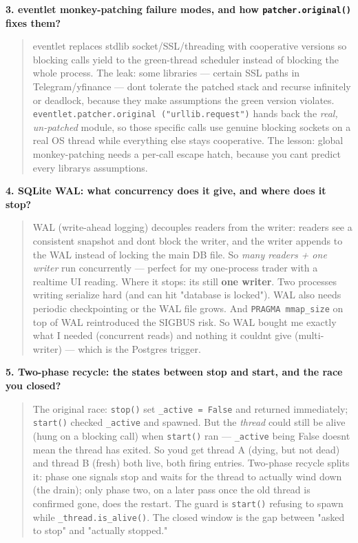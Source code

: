 \documentclass[11pt]{article}
\begin{document}
\textbf{3. eventlet monkey-patching failure modes, and how \texttt{patcher.original()} fixes them?}

\begin{quote}
eventlet replaces stdlib socket/SSL/threading with cooperative versions so blocking calls yield
to the green-thread scheduler instead of blocking the whole process. The leak: some libraries ---
certain SSL paths in Telegram/yfinance --- don\textquotesingle t tolerate the patched stack and recurse infinitely
or deadlock, because they make assumptions the green version violates. \texttt{eventlet.patcher.original\ ("urllib.request")} hands back the \emph{real, un-patched} module, so those specific calls use genuine
blocking sockets on a real OS thread while everything else stays cooperative. The lesson: global
monkey-patching needs a per-call escape hatch, because you can\textquotesingle t predict every library\textquotesingle s
assumptions.
\end{quote}

\textbf{4. SQLite WAL: what concurrency does it give, and where does it stop?}

\begin{quote}
WAL (write-ahead logging) decouples readers from the writer: readers see a consistent snapshot
and don\textquotesingle t block the writer, and the writer appends to the WAL instead of locking the main DB
file. So \emph{many readers + one writer} run concurrently --- perfect for my one-process trader with a
realtime UI reading. Where it stops: it\textquotesingle s still \textbf{one writer}. Two processes writing serialize
hard (and can hit "database is locked"). WAL also needs periodic checkpointing or the WAL file
grows. And \texttt{PRAGMA\ mmap\_size} on top of WAL reintroduced the SIGBUS risk. So WAL bought me exactly
what I needed (concurrent reads) and nothing it couldn\textquotesingle t give (multi-writer) --- which is the
Postgres trigger.
\end{quote}

\textbf{5. Two-phase recycle: the states between stop and start, and the race you closed?}

\begin{quote}
The original race: \texttt{stop()} set \texttt{\_active\ =\ False} and returned immediately; \texttt{start()} checked
\texttt{\_active} and spawned. But the \emph{thread} could still be alive (hung on a blocking call) when
\texttt{start()} ran --- \texttt{\_active} being False doesn\textquotesingle t mean the thread has exited. So you\textquotesingle d get thread A
(dying, but not dead) and thread B (fresh) both live, both firing entries. Two-phase recycle
splits it: phase one signals stop and waits for the thread to actually wind down (the drain);
only phase two, on a later pass once the old thread is confirmed gone, does the restart. The
guard is \texttt{start()} refusing to spawn while \texttt{\_thread.is\_alive()}. The closed window is the gap
between "asked to stop" and "actually stopped."
\end{quote}
\end{document}
